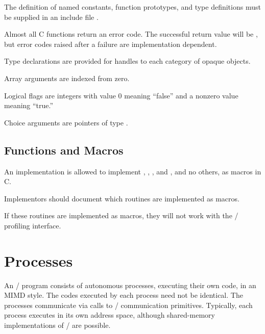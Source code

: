 The definition of named constants, function prototypes, and type
definitions must be supplied in an include file .

Almost all C functions return an error code.  The successful return value will
be , but error codes raised after a failure are implementation dependent.

Type declarations are provided for handles to each category of opaque
objects.

Array arguments are indexed from zero.

Logical flags are integers with value 0 meaning ``false'' and a nonzero
value meaning ``true.''

Choice arguments are pointers of type .


\subsection{Functions and Macros}
\label{sec:macros}

An implementation is allowed to implement
, ,
, and , and
no others, as macros in C.

\begin{implementors}
Implementors should document which routines are implemented as macros.
\end{implementors}
\begin{users}
If these routines are implemented as macros, they will not work with the \mpi/
profiling interface.
\end{users}


\section{Processes}
\label{subsec:terms:processes}

An \MPI/ program consists of autonomous processes, executing their own
code, in
an
MIMD style. The codes executed by each process need not be
identical.  The processes communicate via calls to \MPI/ communication
primitives.  Typically, each process executes in its own address
space, although shared-memory implementations of \MPI/ are possible.

